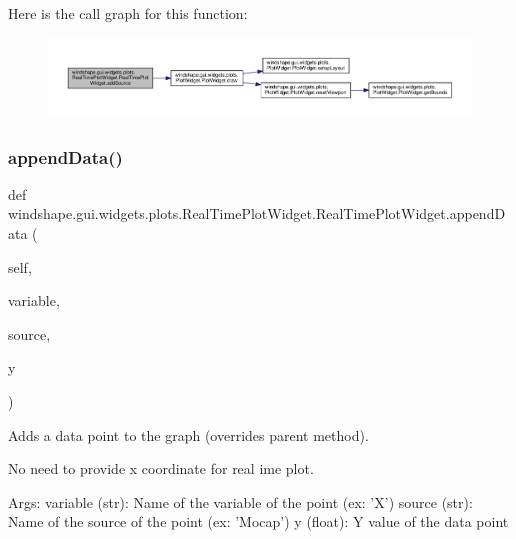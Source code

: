 Here is the call graph for this function\+:\nopagebreak
\begin{figure}[H]
\begin{center}
\leavevmode
\includegraphics[width=350pt]{classwindshape_1_1gui_1_1widgets_1_1plots_1_1_real_time_plot_widget_1_1_real_time_plot_widget_a5d037e52b4db09c9f67653b1040e21b3_cgraph}
\end{center}
\end{figure}
\mbox{\label{classwindshape_1_1gui_1_1widgets_1_1plots_1_1_real_time_plot_widget_1_1_real_time_plot_widget_aa0a1266b8255059c461bd7b408c59fa7}} 
\subsubsection{\texorpdfstring{append\+Data()}{appendData()}}
{\footnotesize\ttfamily def windshape.\+gui.\+widgets.\+plots.\+Real\+Time\+Plot\+Widget.\+Real\+Time\+Plot\+Widget.\+append\+Data (\begin{DoxyParamCaption}\item[{}]{self,  }\item[{}]{variable,  }\item[{}]{source,  }\item[{}]{y }\end{DoxyParamCaption})}

\begin{DoxyVerb}Adds a data point to the graph (overrides parent method).
    
No need to provide x coordinate for real ime plot.
    
Args:
    variable (str): Name of the variable of the point (ex: 'X')
    source (str): Name of the source of the point (ex: 'Mocap')
    y (float): Y value of the data point
\end{DoxyVerb}
 

